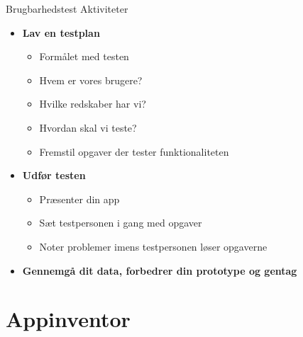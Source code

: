 \documentclass[10pt]{beamer}
\begin{document}
\begin{frame}{Brugbarhedstest Aktiviteter}
	\begin{itemize}
		\item \textbf{Lav en testplan}
		\begin{itemize}
			\item Formålet med testen
			\item Hvem er vores brugere?
			\item Hvilke redskaber har vi?
			\item Hvordan skal vi teste?
			\item Fremstil opgaver der tester funktionaliteten
		\end{itemize}
		\item \textbf{Udfør testen}
			\begin{itemize}
				\item Præsenter din app
				\item Sæt testpersonen i gang med opgaver
				\item Noter problemer imens testpersonen løser opgaverne
			\end{itemize}
		\item \textbf{Gennemgå dit data, forbedrer din prototype og gentag}
	\end{itemize}

\end{frame}

\section{Appinventor}

 
\end{document}
